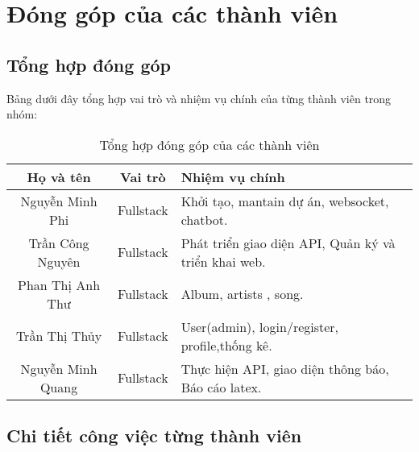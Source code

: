 \chapter{Đóng góp của các thành viên}
\section{Tổng hợp đóng góp}
Bảng dưới đây tổng hợp vai trò và nhiệm vụ chính của từng thành viên trong nhóm:

\begin{table}[H]
    \centering
    \begin{tabular}{|c|c|p{10cm}|}
        \hline
        \textbf{Họ và tên} & \textbf{Vai trò} & \textbf{Nhiệm vụ chính} \\
        \hline
        Nguyễn Minh Phi & Fullstack & Khởi tạo, mantain dự án, websocket, chatbot. \\
        \hline
            Trần Công Nguyên & Fullstack & Phát triển giao diện API, Quản ký và triển khai web. \\
        \hline
        Phan Thị Anh Thư & Fullstack &  Album, artists , song. \\
        \hline
        Trần Thị Thủy & Fullstack & User(admin), login/register, profile,thống kê. \\
        \hline
        Nguyễn Minh Quang & Fullstack & Thực hiện API, giao diện thông báo, Báo cáo latex. \\
        \hline
    \end{tabular}
    \caption{Tổng hợp đóng góp của các thành viên}
\end{table}

\section{Chi tiết công việc từng thành viên}
